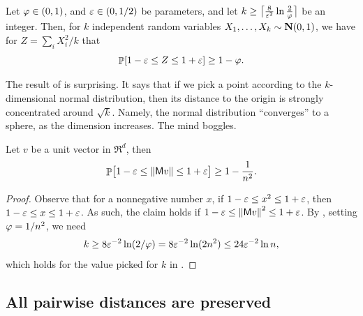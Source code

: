 \begin{corollary}
    Let $\varphi \in (0,1)$, and ${\varepsilon} \in (0,1/2)$ be parameters,
    and let
    $k \geq \bigl\lceil{\frac{8}{{\varepsilon}^2} \ln
       \frac{2}{\varphi}}\bigr\rceil$ be an integer. Then, for $k$
    independent random variables
    $X_1, \ldots, X_k \sim \NormalY{0}{1}$, we have for
    $Z = \sum_i X_i^2/k$ that
    \begin{equation*}
        \Prob{ 1-\eps \leq Z \leq 1+\eps} \geq 1 - \BadProb.
    \end{equation*}
\end{corollary}


\begin{remark}
    The result of  is surprising. It says that if we
    pick a point according to the $k$-dimensional normal distribution,
    then its distance to the origin is strongly concentrated around
    $\sqrt{k}$. Namely, the normal distribution ``converges'' to a
    sphere, as the dimension increases. The mind boggles.
\end{remark}


\begin{lemma}
    Let $v$ be a unit vector in $\Re^d$, then
    \begin{equation*}
        \Prob{ 1-\eps \leq  \norm{\Matrix v } \leq 1+\eps \bigr.}%
        \geq
        1- \frac{1}{n^2}. 
    \end{equation*}
\end{lemma}
\begin{proof}
    Observe that for a nonnegative number $x$, if
    $1-{\varepsilon} \leq x^2 \leq 1+{\varepsilon}$, then $1-{\varepsilon} \leq x \leq
    1+{\varepsilon}$. As such, the claim holds if
    $1-{\varepsilon} \leq \left\| {\mathsf{M} v } \right\|^2 \leq 1+{\varepsilon}$.  By ,
    setting $\varphi = 1/n^2$, we need
    \begin{equation*}
        k%
        \geq%
        8\eps^{-2}\ln (2/\BadProb)
        =
        8 \eps^{-2} \ln (2n^2)%
        \leq%
        24 \eps^{-2} \ln n,
    \end{equation*}
    which holds for the value picked for $k$ in 
    .
\end{proof}


\subsection{All pairwise distances are preserved}

